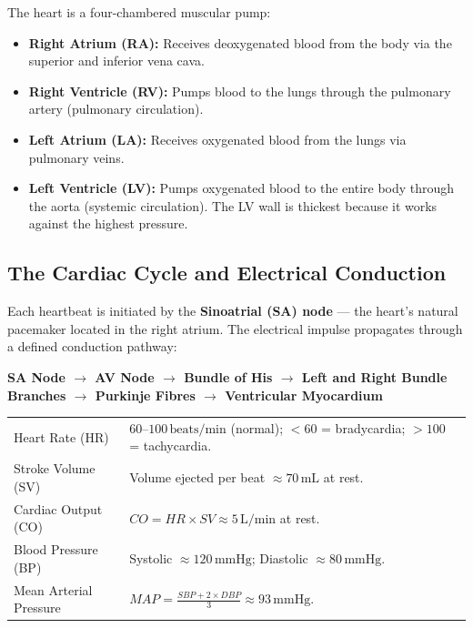 \documentclass[12pt,a4paper]{article}
\renewcommand{\arraystretch}{1.45}
\begin{document}
The heart is a four-chambered muscular pump:
\begin{itemize}[leftmargin=*, itemsep=3pt]
  \item \textbf{Right Atrium (RA):} Receives deoxygenated blood from the body via the superior and inferior vena cava.
  \item \textbf{Right Ventricle (RV):} Pumps blood to the lungs through the pulmonary artery (pulmonary circulation).
  \item \textbf{Left Atrium (LA):} Receives oxygenated blood from the lungs via pulmonary veins.
  \item \textbf{Left Ventricle (LV):} Pumps oxygenated blood to the entire body through the aorta (systemic circulation). The LV wall is thickest because it works against the highest pressure.
\end{itemize}

\subsection{The Cardiac Cycle and Electrical Conduction}

Each heartbeat is initiated by the \textbf{Sinoatrial (SA) node} --- the heart's natural pacemaker located in the right atrium. The electrical impulse propagates through a defined conduction pathway:

\textbf{SA Node $\to$ AV Node $\to$ Bundle of His $\to$ Left and Right Bundle Branches $\to$ Purkinje Fibres $\to$ Ventricular Myocardium}

\begin{tcolorbox}[formulabox, title={\textbf{Cardiovascular Parameters and Normal Values}}]
\renewcommand{\arraystretch}{1.3}
\begin{tabularx}{\linewidth}{B{3.8cm} X}
Heart Rate (HR) & $60$--$100\,\text{beats/min}$ (normal); $< 60$ = bradycardia; $> 100$ = tachycardia. \\[4pt]
Stroke Volume (SV) & Volume ejected per beat $\approx 70\,\text{mL}$ at rest. \\[4pt]
Cardiac Output (CO) & $CO = HR \times SV \approx 5\,\text{L/min}$ at rest. \\[4pt]
Blood Pressure (BP) & Systolic $\approx 120\,\text{mmHg}$; Diastolic $\approx 80\,\text{mmHg}$. \\[4pt]
Mean Arterial Pressure & $MAP = \displaystyle\frac{SBP + 2 \times DBP}{3} \approx 93\,\text{mmHg}$.
\end{tabularx}
\end{tcolorbox}
\end{document}
